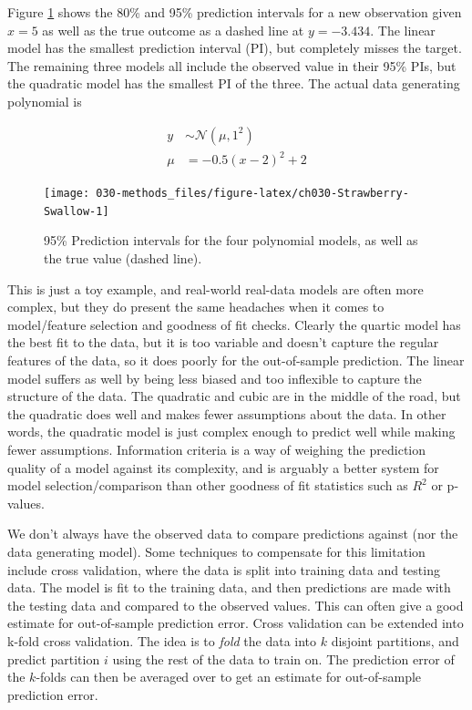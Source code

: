 \documentclass[11pt, oneside, openany]{scrbook}
\begin{document}
Figure \ref{fig:ch030-Strawberry-Swallow} shows the 80\% and 95\% prediction intervals for a new observation given \(x = 5\) as well as the true outcome as a dashed line at \(y = -3.434\). The linear model has the smallest prediction interval (PI), but completely misses the target. The remaining three models all include the observed value in their 95\% PIs, but the quadratic model has the smallest PI of the three. The actual data generating polynomial is

\begin{align*}
y &\sim \mathcal{N}(\mu, 1^2) \\
\mu &= -0.5(x - 2)^2 + 2
\end{align*}

\begin{figure}

{\centering \texttt{[image: 030-methods\_files/figure-latex/ch030-Strawberry-Swallow-1]} 

}

\caption{95\% Prediction intervals for the four polynomial models, as well as the true value (dashed line).}\label{fig:ch030-Strawberry-Swallow}
\end{figure}

This is just a toy example, and real-world real-data models are often more complex, but they do present the same headaches when it comes to model/feature selection and goodness of fit checks. Clearly the quartic model has the best fit to the data, but it is too variable and doesn't capture the regular features of the data, so it does poorly for the out-of-sample prediction. The linear model suffers as well by being less biased and too inflexible to capture the structure of the data. The quadratic and cubic are in the middle of the road, but the quadratic does well and makes fewer assumptions about the data. In other words, the quadratic model is just complex enough to predict well while making fewer assumptions. Information criteria is a way of weighing the prediction quality of a model against its complexity, and is arguably a better system for model selection/comparison than other goodness of fit statistics such as \(R^2\) or p-values.

We don't always have the observed data to compare predictions against (nor the data generating model). Some techniques to compensate for this limitation include cross validation, where the data is split into training data and testing data. The model is fit to the training data, and then predictions are made with the testing data and compared to the observed values. This can often give a good estimate for out-of-sample prediction error. Cross validation can be extended into k-fold cross validation. The idea is to \emph{fold} the data into \(k\) disjoint partitions, and predict partition \(i\) using the rest of the data to train on. The prediction error of the \(k\)-folds can then be averaged over to get an estimate for out-of-sample prediction error.
\end{document}
